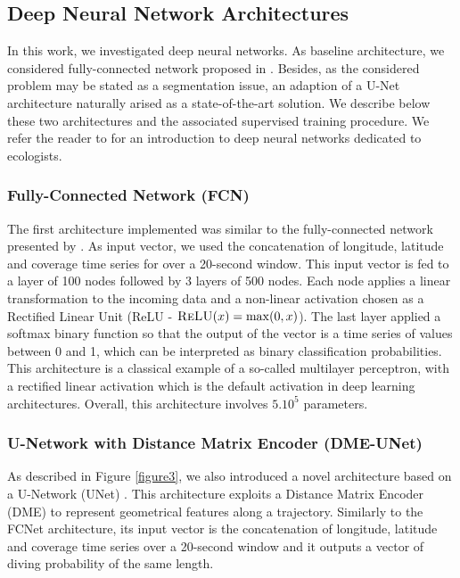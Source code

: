\documentclass{article}
\begin{document}
\subsection{Deep Neural Network Architectures}

In this work, we investigated deep neural networks. As baseline architecture, we considered fully-connected network proposed in \cite{browning_predicting_2018}. Besides, as the considered problem may be stated as a segmentation issue, an adaption of a U-Net architecture naturally arised as a state-of-the-art solution. We describe below these two architectures and the associated supervised training procedure. We refer the reader to \cite{christin_applications_2019} for an introduction to deep neural networks dedicated to ecologists.

\subsubsection{Fully-Connected Network (FCN)}
The first architecture implemented was similar to the fully-connected network presented by \cite{browning_predicting_2018}. As input vector, we used the concatenation of longitude, latitude and coverage time series for over a 20-second window. This input vector is fed to a layer of 100 nodes followed by 3 layers of 500 nodes. Each node applies a linear transformation to the incoming data and a non-linear activation chosen as a Rectified Linear Unit (ReLU - $\textsc{ReLU}(x) = \max(0,x)$). The last layer applied a softmax binary function so that the output of the vector is a time series of values between  0 and 1, which can be interpreted as binary classification probabilities.
This  architecture is a classical example of a so-called multilayer perceptron, with a rectified linear activation which is the default activation in deep learning architectures. Overall, this architecture involves $5.10^{5}$ parameters.

\subsubsection{U-Network with Distance Matrix Encoder (DME-UNet)}
As described in Figure \ref{figure3}, we also introduced a novel architecture based on a U-Network (UNet)  \cite{ronneberger_u-net_2015}. This architecture exploits a
Distance Matrix Encoder (DME) to represent geometrical features along a trajectory.
Similarly to the FCNet architecture, its input vector is the concatenation of longitude, latitude and coverage time series over a 20-second window and it outputs a vector of diving probability of the same length.
\end{document}
